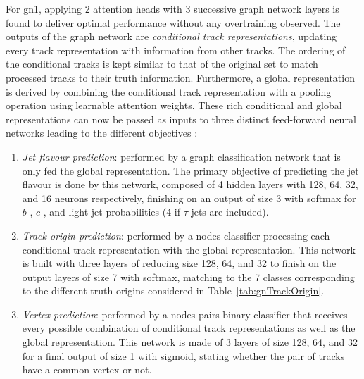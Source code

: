 For \gls{gn1}, applying 2 attention heads with 3 successive graph network layers is found to deliver optimal performance without any overtraining observed. The outputs of the graph network are \textit{conditional track representations}, updating every track representation with information from other tracks. The ordering of the conditional tracks is kept similar to that of the original set to match processed tracks to their truth information. Furthermore, a global representation is derived by combining the conditional track representation with a pooling operation using learnable attention weights. These rich conditional and global representations can now be passed as inputs to three distinct feed-forward neural networks leading to the different objectives \cite{ATL-PHYS-PUB-2022-027}:
\begin{enumerate}
  \item \textit{Jet flavour prediction}: performed by a graph classification network that is only fed the global representation. The primary objective of predicting the jet flavour is done by this network, composed of 4 hidden layers with 128, 64, 32, and 16 neurons respectively, finishing on an output of size 3 with softmax for $b$-, $c$-, and light-jet probabilities (4 if $\tau$-jets are included).
  \item \textit{Track origin prediction}: performed by a nodes classifier processing each conditional track representation with the global representation. This network is built with three layers of reducing size 128, 64, and 32 to finish on the output layers of size 7 with softmax, matching to the 7 classes corresponding to the different truth origins considered in Table~\ref{tab:gnTrackOrigin}.
  \item \textit{Vertex prediction}: performed by a nodes pairs binary classifier that receives every possible combination of conditional track representations as well as the global representation. This network is made of 3 layers of size 128, 64, and 32 for a final output of size 1 with sigmoid, stating whether the pair of tracks have a common vertex or not. 
\end{enumerate}


